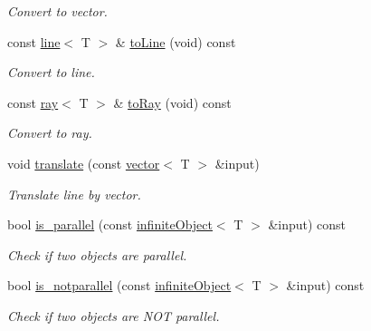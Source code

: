 \begin{DoxyCompactItemize}
\begin{DoxyCompactList}\small\item\em Convert to vector. \end{DoxyCompactList}\item 
\mbox{\label{classddd_1_1infinite_object_ab51b563ee31f9b473cc2459f6fd6caae}} 
const \hyperlink{classddd_1_1line}{line}$<$ T $>$ \& \hyperlink{classddd_1_1infinite_object_ab51b563ee31f9b473cc2459f6fd6caae}{to\+Line} (void) const
\begin{DoxyCompactList}\small\item\em Convert to line. \end{DoxyCompactList}\item 
\mbox{\label{classddd_1_1infinite_object_ac34ea2bfd432c3a07c03b508c3e1e499}} 
const \hyperlink{classddd_1_1ray}{ray}$<$ T $>$ \& \hyperlink{classddd_1_1infinite_object_ac34ea2bfd432c3a07c03b508c3e1e499}{to\+Ray} (void) const
\begin{DoxyCompactList}\small\item\em Convert to ray. \end{DoxyCompactList}\item 
void \hyperlink{classddd_1_1infinite_object_a72649daa44060efdbef986ab9d90f3f6}{translate} (const \hyperlink{classddd_1_1vector}{vector}$<$ T $>$ \&input)
\begin{DoxyCompactList}\small\item\em Translate line by vector. \end{DoxyCompactList}\item 
bool \hyperlink{classddd_1_1infinite_object_a52c16b849e5bd987c69ed6ae79a6cab1}{is\+\_\+parallel} (const \hyperlink{classddd_1_1infinite_object}{infinite\+Object}$<$ T $>$ \&input) const
\begin{DoxyCompactList}\small\item\em Check if two objects are parallel. \end{DoxyCompactList}\item 
bool \hyperlink{classddd_1_1infinite_object_ad4f312a6d767c5825632d8915a9f7dbc}{is\+\_\+notparallel} (const \hyperlink{classddd_1_1infinite_object}{infinite\+Object}$<$ T $>$ \&input) const
\begin{DoxyCompactList}\small\item\em Check if two objects are N\+OT parallel. \end{DoxyCompactList}\item 

\end{DoxyCompactItemize}
